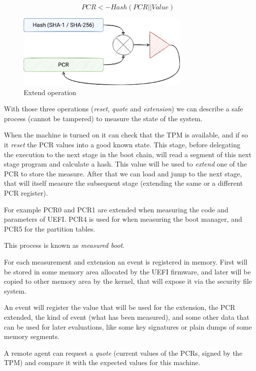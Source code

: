 \documentclass{article}
\begin{document}
\[ PCR <- Hash(PCR || Value) \]

\begin{figure}[h]
  \centering
  \includegraphics[width=0.75\textwidth]{extend}
  \caption{Extend operation}
  \label{fig:extend}
\end{figure}

With those three operations (\emph{reset}, \emph{quote} and
\emph{extension}) we can describe a safe process (cannot be tampered)
to measure the state of the system.

When the machine is turned on it can check that the TPM is available,
and if so it \emph{reset} the PCR values into a good known state.
This stage, before delegating the execution to the next stage in the
boot chain, will read a segment of this next stage program and
calculate a hash.  This value will be used to \emph{extend} one of the
PCR to store the measure.  After that we can load and jump to the next
stage, that will itself measure the subsequent stage (extending the
same or a different PCR register).

For example PCR0 and PCR1 are extended when measuring the code and
parameters of UEFI.  PCR4 is used for when measuring the boot manager,
and PCR5 for the partition tables.

This process is known as \emph{measured boot}.

For each measurement and extension an event is registered in memory.
First will be stored in some memory area allocated by the UEFI
firmware, and later will be copied to other memory area by the kernel,
that will expose it via the security file system.

An event will register the value that will be used for the extension,
the PCR extended, the kind of event (what has been measured), and some
other data that can be used for later evaluations, like some key
signatures or plain dumps of some memory segments.

A remote agent can request a \emph{quote} (current values of the PCRs,
signed by the TPM) and compare it with the expected values for this
machine.
\end{document}

